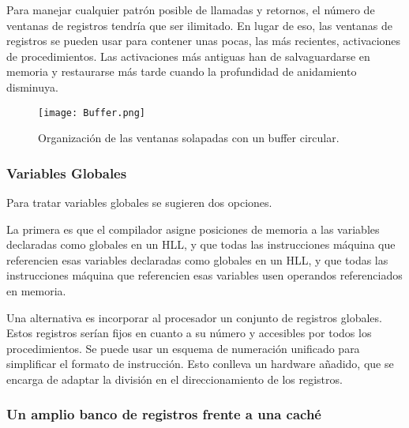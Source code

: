 Para manejar cualquier patrón posible de llamadas y retornos, el número de ventanas de registros tendría que ser ilimitado. En lugar de eso, las ventanas de registros se pueden usar para contener unas pocas, las más recientes, activaciones de procedimientos. Las activaciones más antiguas han de salvaguardarse en memoria y restaurarse más tarde cuando la profundidad de anidamiento disminuya.

\begin{figure}[H]
  \centering
  \texttt{[image: Buffer.png]}
  \caption{Organización de las ventanas solapadas con un buffer circular.}
\end{figure}

\subsubsection*{Variables Globales}

Para tratar variables globales se sugieren dos opciones.

La primera es que el compilador asigne posiciones de memoria a las variables declaradas como globales en un HLL, y que todas las instrucciones máquina que referencien esas variables declaradas como globales en un HLL, y que todas las instrucciones máquina que referencien esas variables usen operandos referenciados en memoria.

Una alternativa es incorporar al procesador un conjunto de registros globales. Estos registros serían fijos en cuanto a su número y accesibles por todos los procedimientos. Se puede usar un esquema de numeración unificado para simplificar el formato de instrucción. Esto conlleva un hardware añadido, que se encarga de adaptar la división en el direccionamiento de los registros.

\subsubsection*{Un amplio banco de registros frente a una caché}

